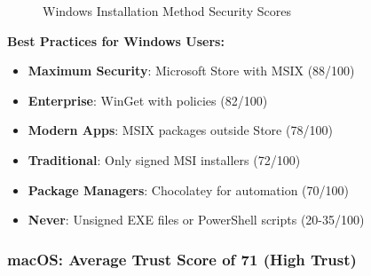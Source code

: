 \documentclass[11pt,a4paper]{article}
\begin{document}
\begin{figure}[h]
\caption{Windows Installation Method Security Scores}
\end{figure}

\textbf{Best Practices for Windows Users:}
\begin{itemize}
    \item \textbf{Maximum Security}: Microsoft Store with MSIX (88/100)
    \item \textbf{Enterprise}: WinGet with policies (82/100)
    \item \textbf{Modern Apps}: MSIX packages outside Store (78/100)
    \item \textbf{Traditional}: Only signed MSI installers (72/100)
    \item \textbf{Package Managers}: Chocolatey for automation (70/100)
    \item \textbf{Never}: Unsigned EXE files or PowerShell scripts (20-35/100)
\end{itemize}

\subsubsection{macOS: Average Trust Score of 71 (High Trust)}
\end{document}
